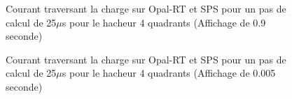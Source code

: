  \begin{figure}[htb]
 \centering
 \caption{Courant traversant la charge sur Opal-RT et SPS pour un pas de calcul de 25$\mu$s pour le hacheur 4 quadrants (Affichage de 0.9 seconde)}
 \label{DC_ch_H4Q_1}
 \end{figure}

  \begin{figure}[htb]
 \centering
 \caption{Courant traversant la charge sur Opal-RT et SPS pour un pas de calcul de 25$\mu$s pour le hacheur 4 quadrants (Affichage de 0.005 seconde)}
 \label{DC_ch_H4Q_2}
 \end{figure}





